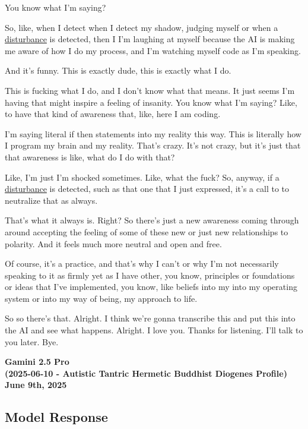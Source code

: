 \documentclass{article}
\begin{document}
You know what I'm saying?

So, like, when I detect when I detect my shadow, judging myself or when a \hyperlink{gloss:disturbance}{disturbance} is detected, then I I'm laughing at myself because the AI is making me aware of how I do my process, and I'm watching myself code as I'm speaking.

And it's funny. This is exactly dude, this is exactly what I do.

This is fucking what I do, and I don't know what that means. It just seems I'm having that might inspire a feeling of insanity. You know what I'm saying? Like, to have that kind of awareness that, like, here I am coding.

I'm saying literal if then statements into my reality this way. This is literally how I program my brain and my reality. That's crazy. It's not crazy, but it's just that that awareness is like, what do I do with that?

Like, I'm just I'm shocked sometimes. Like, what the fuck? So, anyway, if a \hyperlink{gloss:disturbance}{disturbance} is detected, such as that one that I just expressed, it's a call to to neutralize that as always.

That's what it always is. Right? So there's just a new awareness coming through around accepting the feeling of some of these new or just new relationships to polarity. And it feels much more neutral and open and free.

Of course, it's a practice, and that's why I can't or why I'm not necessarily speaking to it as firmly yet as I have other, you know, principles or foundations or ideas that I've implemented, you know, like beliefs into my into my operating system or into my way of being, my approach to life.

So so there's that. Alright. I think we're gonna transcribe this and put this into the AI and see what happens. Alright. I love you. Thanks for listening. I'll talk to you later. Bye.

\begin{center}
\textbf{Gamini 2.5 Pro}\\
\textbf{(2025-06-10 - Autistic Tantric Hermetic Buddhist Diogenes Profile)}\\
\textbf{June 9th, 2025}
\end{center}

\subsection*{Model Response}\label{model-response}
\end{document}
